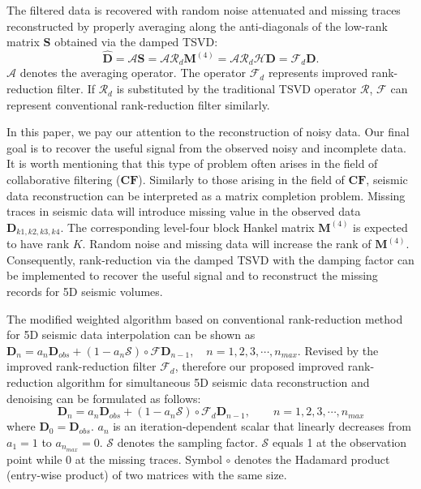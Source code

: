 The filtered data is recovered with random noise attenuated and missing traces reconstructed by properly averaging along the anti-diagonals of the low-rank matrix $\mathbf{S}$ obtained via the damped TSVD:\\
\begin{equation}
\label{eq:dmssaopt}
\hat{\mathbf{D}}=\mathcal{A}\mathbf{S}=\mathcal{A}\mathcal{R}_d\mathbf{M}^{(4)}=\mathcal{A}\mathcal{R}_d\mathcal{H}\mathbf{D}=\mathcal{F}_d\mathbf{D}.
\end{equation}
$\mathcal{A}$ denotes the averaging operator. The operator $\mathcal{F}_d$ represents improved rank-reduction filter. If $\mathcal{R}_d$ is substituted by the traditional TSVD operator $\mathcal{R}$, $\mathcal{F}$ can represent conventional rank-reduction filter similarly.

In this paper, we pay our attention to the reconstruction of noisy data. Our final goal is to recover the useful signal from the observed noisy and incomplete data. It is worth mentioning that this type of problem often arises in the field of collaborative filtering ($\mathbf{CF}$). Similarly to those arising in the field of $\mathbf{CF}$, seismic data reconstruction can be interpreted as a matrix completion problem. Missing traces in seismic data will introduce missing value in the observed data $\mathbf{D}_{k1,k2,k3,k4}$. The corresponding level-four block Hankel matrix $\mathbf{M}^{(4)}$ is expected to have rank $K$. Random noise and missing data will increase the rank of $\mathbf{M}^{(4)}$. Consequently, rank-reduction via the damped TSVD with the damping factor can be implemented to recover the useful signal and to reconstruct the missing records for 5D seismic volumes.

The modified weighted  algorithm based on conventional rank-reduction method for 5D seismic data interpolation can be shown as
$\mathbf{D}_n=a_n \mathbf{D}_{obs} + (1-a_n\mathcal{S})\circ \mathcal{F}\mathbf{D}_{n-1},\quad n=1,2,3,\cdots,n_{max}$.
Revised by the improved rank-reduction filter $\mathcal{F}_d$, therefore our proposed improved rank-reduction algorithm for simultaneous 5D seismic data reconstruction and denoising can be formulated as follows:
\begin{equation}
\label{eq:dmssapocs}
\mathbf{D}_n=a_n \mathbf{D}_{obs} + (1-a_n\mathcal{S})\circ \mathcal{F}_d\mathbf{D}_{n-1},\qquad n=1,2,3,\cdots,n_{max}
\end{equation}
where $\mathbf{D}_0=\mathbf{D}_{obs}$. $a_n$ is an iteration-dependent scalar that linearly decreases from $a_1=1$ to $a_{n_{max}}=0$. $\mathcal{S}$ denotes the sampling factor. $\mathcal{S}$ equals 1 at the observation point while 0 at the missing traces. Symbol $\circ$ denotes the Hadamard product (entry-wise product) of two matrices with the same size. 

